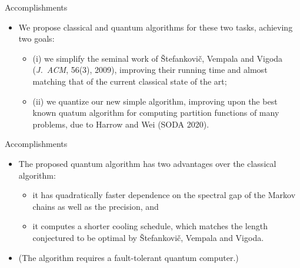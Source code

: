 \documentclass{beamer}
\renewcommand{\>}{\rangle}
\newcommand{\<}{\langle}
\begin{document}
\begin{frame}{Accomplishments}
  \begin{itemize}
    \item We propose classical and quantum algorithms for these two tasks, achieving two goals: 
    
    \medskip
    \begin{itemize}
        \item (i) we simplify the seminal work of \v{S}tefankovi\v{c}, Vempala and Vigoda (\emph{J.~ACM}, 56(3), 2009), improving their running time and almost matching that of the current classical state of the art; 
        
        \medskip
        \item (ii) we quantize our new simple algorithm, improving upon the best known quatum algorithm for computing partition functions of many problems, due to Harrow and Wei (SODA 2020). 
    \end{itemize}
    \end{itemize}
\end{frame}

%

\begin{frame}{Accomplishments}
\begin{itemize}
    \item The proposed quantum algorithm has two advantages over the classical algorithm: 
    
    \medskip
    \begin{itemize}
    \item it has quadratically faster dependence on the spectral gap of the Markov chains as well as the precision, and
    
    \medskip
    \item it computes a shorter cooling schedule, which matches the length conjectured to be optimal by \v{S}tefankovi\v{c}, Vempala and Vigoda. 
\end{itemize}

\bigskip
\bigskip
\item (The algorithm requires a fault-tolerant quantum computer.)
\end{itemize}
\end{frame}

%
\end{document}
